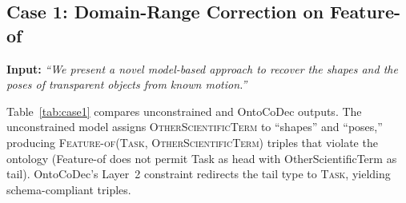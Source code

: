


\subsection{Case 1: Domain-Range Correction on Feature-of}

\noindent\textbf{Input:} \textit{``We present a novel model-based approach to recover the shapes and the poses of transparent objects from known motion.''}

\vspace{0.5em}
\noindent Table~\ref{tab:case1} compares unconstrained and OntoCoDec outputs. The unconstrained model assigns \textsc{OtherScientificTerm} to ``shapes'' and ``poses,'' producing \textsc{Feature-of}(\textsc{Task}, \textsc{OtherScientificTerm}) triples that violate the ontology (Feature-of does not permit Task as head with OtherScientificTerm as tail). OntoCoDec's Layer~2 constraint redirects the tail type to \textsc{Task}, yielding schema-compliant triples.

